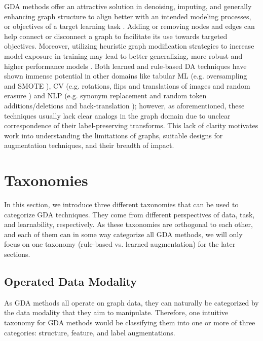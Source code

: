 \documentclass[11pt]{article}
\begin{document}
GDA methods offer an attractive solution in denoising, imputing, and generally enhancing graph structure to align better with an intended modeling processes, or objectives of a target learning task \cite{zhao2021data}.  Adding or removing nodes and edges can help connect or disconnect a graph to facilitate its use towards targeted objectives.  Moreover, utilizing heuristic graph modification strategies to increase model exposure in training may lead to better generalizing, more robust and higher performance models \cite{wang2020nodeaug, kong2020flag, zhou2020data}.  Both learned and rule-based DA techniques have shown immense potential in other domains like tabular ML (e.g. oversampling \cite{barandela2004imbalanced} and SMOTE \cite{chawla2002smote}),  CV (e.g. rotations, flips and translations of images \cite{shorten2019survey} and random erasure \cite{zhong2020random}) and NLP (e.g. synonym replacement and random token additions/deletions \cite{wei2019eda} and back-translation \cite{sennrich2015improving}); however, as aforementioned, these techniques usually lack clear analogs in the graph domain due to unclear correspondence of their label-preserving transforms.  This lack of clarity motivates work into understanding the limitations of graphs, suitable designs for augmentation techniques, and their breadth of impact. 

\section{Taxonomies}
\label{sec:taxonomy}

In this section, we introduce three different taxonomies that can be used to categorize GDA techniques. They come from different perspectives of data, task, and learnability, respectively. As these taxonomies are orthogonal to each other, and each of them can in some way categorize all GDA methods, we will only focus on one taxonomy (rule-based vs. learned augmentation) for the later sections.

\subsection{Operated Data Modality}
As GDA methods all operate on graph data, they can naturally be categorized by the data modality that they aim to manipulate. Therefore, one intuitive taxonomy for GDA methods would be classifying them into one or more of three categories: structure, feature, and label augmentations.
\end{document}
